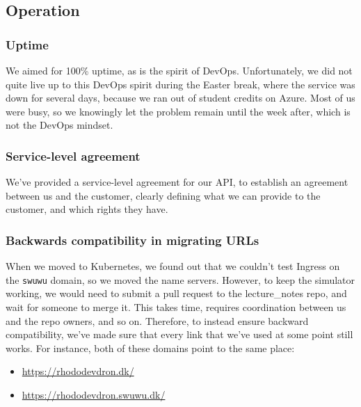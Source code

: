 \subsection{Operation}

\subsubsection{Uptime}

We aimed for 100\% uptime, as is the spirit of DevOps. Unfortunately, we did not quite live up to this DevOps spirit during the Easter break, where the service was down for several days, because we ran out of student credits on Azure. Most of us were busy, so we knowingly let the problem remain until the week after, which is not the DevOps mindset.


\subsubsection{Service-level agreement}

We've provided a service-level agreement \cite{sla:itu-minitwit} for our API, to establish an agreement between us and the customer, clearly defining what we can provide to the customer, and which rights they have.


\subsubsection{Backwards compatibility in migrating URLs}

When we moved to Kubernetes, we found out that we couldn't test Ingress on the \texttt{swuwu} domain, so we moved the name servers.
However, to keep the simulator working, we would need to submit a pull request to the lecture\_notes repo, and wait for someone to merge it. This takes time, requires coordination between us and the repo owners, and so on. Therefore, to instead ensure backward compatibility, we've made sure that every link that we've used at some point still works.
For instance, both of these domains point to the same place:
\begin{itemize}
    \item \url{https://rhododevdron.dk/}
    \item \url{https://rhododevdron.swuwu.dk/}
\end{itemize}
